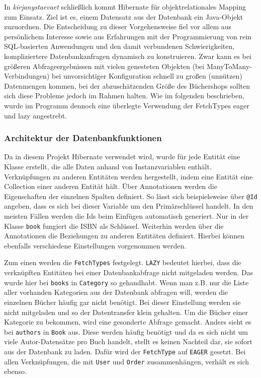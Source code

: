 	In \textit{kirjanystaevaet} schließlich kommt Hibernate für objektrelationales Mapping zum Einsatz. Ziel ist es, einem Datensatz aus der Datenbank ein Java-Objekt zuzuordnen. Die Entscheidung zu dieser Vorgehensweise fiel vor allem aus persönlichem Interesse sowie aus Erfahrungen mit der Programmierung von rein SQL-basierten Anwendungen und den damit verbundenen Schwierigkeiten, kompliziertere Datenbankanfragen dynamisch zu konstruieren. Zwar kann es bei größeren Abfrageergebnissen mit vielen genesteten Objekten (bei ManyToMany-Verbindungen) bei unvorsichtiger Konfiguration schnell zu großen (unnützen) Datenmengen kommen, bei der abzuschätzenden Größe des Büchershops sollten sich diese Probleme jedoch im Rahmen halten. Wie im folgenden beschrieben, wurde im Programm dennoch eine überlegte Verwendung der FetchTypes eager und lazy angestrebt.
		
		\subsubsection{Architektur der Datenbankfunktionen}\label{sec:umsetzung:DB:Funktionen}
		Da in diesem Projekt Hibernate verwendet wird, wurde für jede Entität eine Klasse erstellt, die alle Daten anhand von Instanzvariablen enthält. Verknüpfungen zu anderen Entitäten werden hergestellt, indem eine Entität eine Collection einer anderen Entität hält. Über Annotationen werden die Eigenschaften der einzelnen Spalten definiert. So lässt sich beispielsweise über \texttt{@Id} angeben, dass es sich bei dieser Variable um den Primärschlüssel handelt. In den meisten Fällen werden die Ids beim Einfügen automatisch generiert. Nur in der Klasse \texttt{book} fungiert die ISBN als Schlüssel. Weiterhin werden über die Annotationen die Beziehungen zu anderen Entitäten definiert. Hierbei können ebenfalls verschiedene Einstellungen vorgenommen werden.
		
		Zum einen werden die \texttt{FetchTypes} festgelegt. \texttt{LAZY} bedeutet hierbei, dass die verknüpften Entitäten bei einer Datenbankabfrage nicht mitgeladen werden. Das wurde hier bei \texttt{books} in \texttt{Category} so gehandhabt. Wenn man z.B. nur die Liste aller vorhanden Kategorien aus der Datenbank abfragen will, werden die einzelnen Bücher häufig gar nicht benötigt. Bei dieser Einstellung werden sie nicht mitgeladen und so der Datentransfer klein gehalten. Um die Bücher einer Kategorie zu bekommen, wird eine gesonderte Abfrage gemacht. Anders sieht es bei \texttt{authors} in \texttt{Book} aus. Diese werden häufig benötigt und da es sich nicht um viele Autor-Datensätze pro Buch handelt, stellt es keinen Nachteil dar, sie sofort aus der Datenbank zu laden. Dafür wird der \texttt{FetchType} auf \texttt{EAGER} gesetzt. Bei allen Verknüpfungen, die mit \texttt{User} und \texttt{Order} zusammenhängen, verhält es sich ebenso.
		
